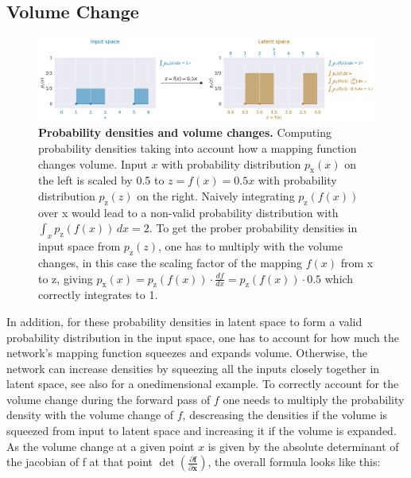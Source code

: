 \subsection{Volume Change}\label{volume-change}

\begin{figure}[ht]
    \myfloatalign
    \includegraphics[width=1\linewidth]{images/change-of-volume.png}
    \caption[Volume change illustration]{
\textbf{Probability densities and volume changes.} Computing probability densities taking into account how a mapping function changes volume. Input $x$ with probability distribution $p_\text{x}(x)$
on the left is scaled by 0.5 to $z=f(x)=0.5x$ with probability
distribution $p_\text{z}(z)$ on the right. Naively integrating
$p_\text{z}(f(x))$ over x would lead to a non-valid probability
distribution with $\int_x p_\mathrm{z}(f(x)) \, dx=2$. To get the
prober probability densities in input space from $p_\text{z}(z)$, one
has to multiply with the volume changes, in this case the scaling factor
of the mapping $f(x)$ from x to z, giving
$p_\text{x}(x)=p_\mathrm{z}(f(x)) \cdot \frac{df}{dx}=p_\mathrm{z}(f(x))\cdot 0.5$
which correctly integrates to 1.
}
\label{change-of-volume-fig}
\end{figure}



    In addition, for these probability densities in latent space to form a
valid probability distribution in the input space, one has to account
for how much the network's mapping function squeezes and expands volume.
Otherwise, the network can increase densities by squeezing all the
inputs closely together in latent space, see also
 for a onedimensional example. To
correctly account for the volume change during the forward pass of $f$
one needs to multiply the probability density with the volume change of
$f$, descreasing the densities if the volume is squeezed from input to
latent space and increasing it if the volume is expanded. As the volume
change at a given point $x$ is given by the absolute determinant of
the jacobian of f at that point
$\det \left( \frac{\partial \mathbf{f}}{\partial \mathbf{x}} \right)$,
the overall formula looks like this:

